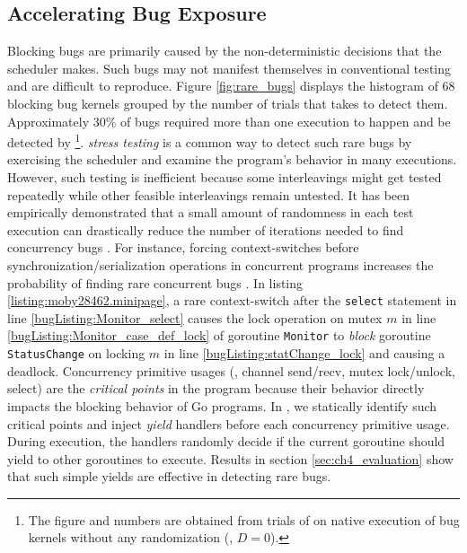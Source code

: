\subsection{Accelerating Bug Exposure}
Blocking bugs are primarily caused by the non-deterministic decisions that the scheduler makes.
%
Such bugs may not manifest themselves in conventional testing and are difficult to reproduce.
%
Figure \ref{fig:rare_bugs} displays the histogram of 68 blocking bug kernels grouped by the number of trials that \goat takes to detect them.
%
Approximately 30\% of bugs required more than one execution to happen and be detected by \goat\footnote{The figure and numbers are obtained from trials of \goat on native execution of bug kernels without any randomization (\ie, $D=0$).}.
%
\textit{stress testing} is a common way to detect such rare bugs by exercising the scheduler and examine the program's behavior in many executions.
%
However, such testing is inefficient because some interleavings might get tested repeatedly while other feasible interleavings remain untested.
%
It has been empirically demonstrated that a small amount of randomness in each test execution can drastically reduce the number of iterations needed to find concurrency bugs \cite{thomson-concurrencyTesting-ppopp14,emmi-delayBounded-popl11}.
%
For instance, forcing context-switches before synchronization/serialization operations in concurrent programs increases the probability of finding rare concurrent bugs \cite{burckhardt-depthBug-asplos10}.
%
In listing \ref{listing:moby28462.minipage}, a rare context-switch after the \texttt{select} statement in line \ref{bugListing:Monitor_select} causes the lock operation on mutex $m$ in line \ref{bugListing:Monitor_case_def_lock} of goroutine \texttt{Monitor} to \textit{block} goroutine \texttt{StatusChange} on locking $m$ in line \ref{bugListing:statChange_lock} and causing a deadlock.
%
Concurrency primitive usages (\eg, channel send/recv, mutex lock/unlock, select) are the \textit{critical points} in the program because their behavior directly impacts the blocking behavior of Go programs.
%
In \goat, we statically identify such critical points and inject \textit{yield} handlers before each concurrency primitive usage.
%
During execution, the handlers randomly decide if the current goroutine should yield to other goroutines to execute.
%
Results in section \ref{sec:ch4_evaluation} show that such simple yields are effective in detecting rare bugs.

